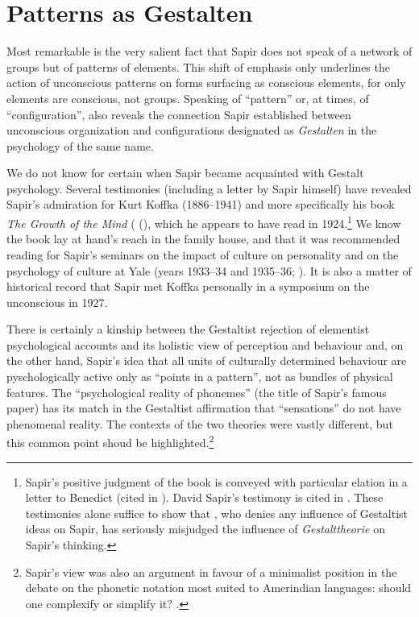 \documentclass[output=paper]{langscibook}
\begin{document}
\section{Patterns as Gestalten}
\label{sec:fortis:patternsgestalten}

Most remarkable is the very salient fact that Sapir does not speak of a network of groups but of patterns of elements. This shift of emphasis only underlines the action of unconscious patterns on forms surfacing as conscious elements, for only elements are conscious, not groups. Speaking of ``pattern'' or, at times, of ``configuration'', also reveals the connection Sapir established between unconscious organization and configurations designated as \emph{Gestalten} in the psychology of the same name. 

We do not know for certain when Sapir became acquainted with Gestalt psychology. Several testimonies (including a letter by Sapir himself) have revealed Sapir's admiration for Kurt Koffka (1886--1941) and more specifically his book \emph{The Growth of the Mind} ( (\citeyear{Koffka1924}), which he appears to have read in 1924.\footnote{Sapir's positive judgment of the book is conveyed with particular elation in a letter to Benedict (cited in \citealt[121]{Sapir2002}). David Sapir's testimony is cited in \citep[478]{Cowan1986}. These testimonies alone suffice to show that \citet{Murray1981}, who denies any influence of Gestaltist ideas on Sapir, has seriously misjudged the influence of \emph{Gestalttheorie} on Sapir's thinking.} We know the book lay at hand's reach in the family house, and that it was recommended reading for Sapir's seminars on the impact of culture on personality and on the psychology of culture at Yale (years 1933--34 and 1935--36; \citealt[677]{Sapir19991933}). It is also a matter of historical record that Sapir met Koffka personally in a symposium on the unconscious in 1927. 

There is certainly a kinship between the Gestaltist rejection of elementist psychological accounts and its holistic view of perception and behaviour and, on the other hand, Sapir's idea that all units of culturally determined behaviour are pyschologically active only as ``points in a pattern'', not as bundles of physical features. The ``psychological reality of phonemes'' (the title of Sapir's famous paper) has its match in the Gestaltist affirmation that ``sensations'' do not have phenomenal reality. The contexts of the two theories were vastly different, but this common point shoud be highlighted.\footnote{Sapir's view was also an argument in favour of a minimalist position in the debate on the phonetic notation most suited to Amerindian languages: should one complexify or simplify it? \citep[see][285]{Darnell1990}.}
\end{document}
